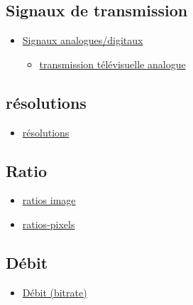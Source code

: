 \documentclass[
]{book}
\providecommand{\tightlist}{%
  \setlength{\itemsep}{0pt}\setlength{\parskip}{0pt}}
\begin{document}
\hypertarget{signaux-de-transmission}{%
\subsection{Signaux de transmission}\label{signaux-de-transmission}}

\begin{itemize}
\tightlist
\item
  \href{https://en.wikipedia.org/wiki/Video\#Analog_video}{Signaux analogues/digitaux}

  \begin{itemize}
  \tightlist
  \item
    \href{https://en.wikipedia.org/wiki/Analog_television}{transmission télévisuelle analogue}
  \end{itemize}
\end{itemize}

\hypertarget{ruxe9solutions}{%
\subsection{résolutions}\label{ruxe9solutions}}

\begin{itemize}
\tightlist
\item
  \href{https://en.wikipedia.org/wiki/Computer_display_standard\#/media/File:Vector_Video_Standards2.svg}{résolutions}
\end{itemize}

\hypertarget{ratio}{%
\subsection{Ratio}\label{ratio}}

\begin{itemize}
\tightlist
\item
  \href{https://en.wikipedia.org/wiki/Display_aspect_ratio}{ratios image}
\item
  \href{https://en.wikipedia.org/wiki/Pixel_aspect_ratio}{ratios-pixels}
\end{itemize}

\hypertarget{duxe9bit}{%
\subsection{Débit}\label{duxe9bit}}

\begin{itemize}
\tightlist
\item
  \href{https://en.wikipedia.org/wiki/Bit_rate\#Video}{Débit (bitrate)}
\end{itemize}
\end{document}
